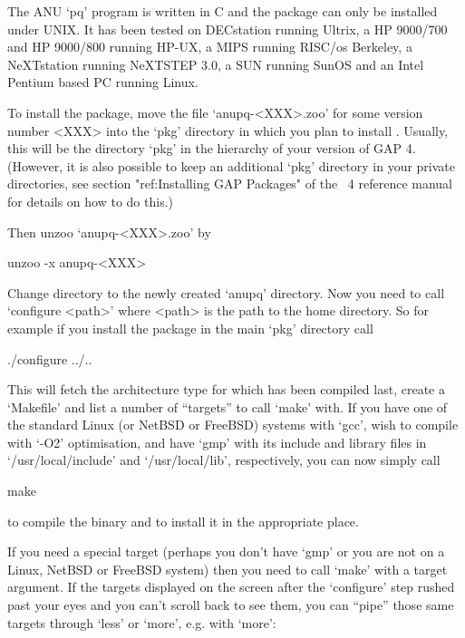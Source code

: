 

The ANU `pq' program is  written  in  C  and  the  package  can  only  be
installed under UNIX. It has been tested on DECstation running Ultrix,  a
HP 9000/700 and  HP  9000/800  running  HP-UX,  a  MIPS  running  RISC/os
Berkeley, a NeXTstation running NeXTSTEP 3.0, a SUN running SunOS and  an
Intel Pentium based PC running Linux.

To install the {\ANUPQ} package, move the file `anupq-<XXX>.zoo' for some
version number <XXX> into the  `pkg'  directory  in  which  you  plan  to
install {\ANUPQ}. Usually, this  will  be  the  directory  `pkg'  in  the
hierarchy of your version of GAP 4. (However, it is also possible to keep
an additional `pkg' directory in your private  directories,  see  section
"ref:Installing GAP  Packages"  of  the  {\GAP}~4  reference  manual  for
details on how to do this.)

Then unzoo `anupq-<XXX>.zoo' by

{}unzoo -x anupq-<XXX>

Change directory to the newly created `anupq' directory. Now you need  to
call `configure <path>' where <path> is  the  path  to  the  {\GAP}  home
directory. So for example if you install the package in  the  main  `pkg'
directory call

\begintt
./configure ../..
\endtt

This will fetch the architecture type for which {\GAP} has been  compiled
last, create a `Makefile' and list a number of ``targets'' to call `make'
with. If you have one of  the  standard  Linux  (or  NetBSD  or  FreeBSD)
systems with `gcc', wish to compile with  `-O2'  optimisation,  and  have
`gmp' with its include and  library  files  in  `/usr/local/include'  and
`/usr/local/lib', respectively, you can now simply call

\begintt
make
\endtt

to compile the binary and to install it in the appropriate place.

If you need a special target (perhaps you don't have `gmp' or you are not
on a Linux, NetBSD or FreeBSD system) then you need to call `make' with a
target argument. If  the  targets  displayed  on  the  screen  after  the
`configure' step rushed past your eyes and you can't scroll back  to  see
them, you can ``pipe'' those same targets through `less' or `more',  e.g.
with `more':

